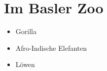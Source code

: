 \section{Im Basler Zoo}

\begin{itemize}
 
\item Gorilla
 
\item Afro-Indische Elefanten
 
\item Löwen

\end{itemize}
   

